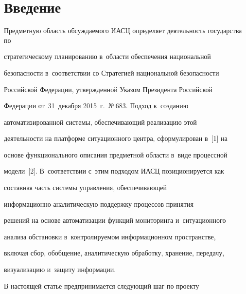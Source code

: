 







      \thispagestyle{headings}


      


      \vspace*{-12pt} 





\section{Введение}


     


     Предметную область обсуждаемого ИАСЦ определяет деятельность государства по 


стратегическому планированию в~области обеспечения национальной 


безопасности в~соответствии со Стратегией национальной без\-опас\-ности 


Российской Федерации, утвержденной Указом Президента Российской 


Федерации от~31~де\-каб\-ря 2015~г.\ №\,683. Подход к~созданию 


автоматизированной системы, обеспечивающий реализацию этой 


деятельности на платформе ситуационного центра, сформулирован в~[1] на 


основе функционального описания предметной области в~виде процессной 


модели~[2]. В~соответствии с~этим подходом ИАСЦ позиционируется как 


составная часть системы управления, обес\-пе\-чи\-ва\-ющей  


ин\-фор\-ма\-ци\-он\-но-ана\-ли\-ти\-че\-скую поддержку процессов принятия 


решений на основе автоматизации функций мониторинга и~ситуационного 


анализа обстановки в~контролируемом информационном пространстве, 


включая сбор, обобщение, аналитическую обработку, хранение, передачу, 


визуализацию и~защиту информации.


     


     В настоящей статье предпринимается следующий шаг по проекту 


